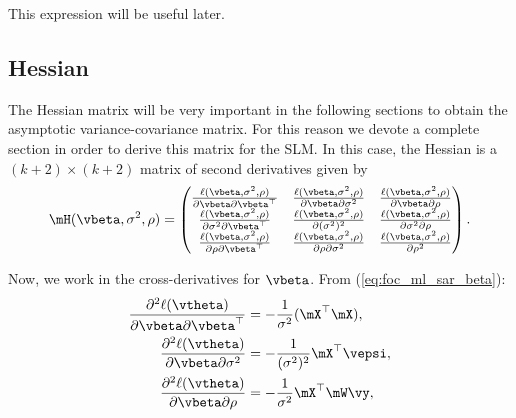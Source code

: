 This expression will be useful later. 

\subsection{Hessian}

The Hessian matrix will be very important in the following sections to obtain the asymptotic variance-covariance matrix. For this reason we devote a complete section in order to derive this matrix for the SLM. In this case, the Hessian is a $(k + 2)\times (k + 2)$ matrix of second derivatives given by
\begin{equation*}
	\mH(\vbeta, \sigma^2, \rho) = 
	\begin{pmatrix}
		\frac{\ell(\vbeta, \sigma^2,\rho)}{\partial \vbeta \partial \vbeta^\top} & \frac{\ell(\vbeta, \sigma^2,\rho)}{\partial \vbeta \partial \sigma^2} & \frac{\ell(\vbeta, \sigma^2,\rho)}{\partial \vbeta \partial \rho} \\
		\frac{\ell(\vbeta, \sigma^2,\rho)}{\partial \sigma^2 \partial \vbeta^\top} & \frac{\ell(\vbeta, \sigma^2,\rho)}{\partial (\sigma^2)^2} & \frac{\ell(\vbeta, \sigma^2,\rho)}{\partial \sigma^2 \partial \rho} \\
		\frac{\ell(\vbeta, \sigma^2,\rho)}{\partial \rho \partial \vbeta^\top} & \frac{\ell(\vbeta, \sigma^2,\rho)}{\partial \rho \partial \sigma^2} & \frac{\ell(\vbeta, \sigma^2,\rho)}{\partial \rho^2}
	\end{pmatrix}. 
\end{equation*}

Now, we work in the cross-derivatives for $\vbeta$. From (\ref{eq:foc_ml_sar_beta}):
\begin{align}
  \frac{\partial^2 \ell(\vtheta)}{\partial \vbeta \partial \vbeta^\top}  & =  - \frac{1}{\sigma^2}(\mX^\top \mX), \label{eq:sar_der_beta_beta} \\
  \frac{\partial^2  \ell(\vtheta)}{\partial \vbeta \partial \sigma^2} &= - \frac{1}{(\sigma^2)^2} \mX^\top \vepsi,\label{eq:sar_der_beta_sigma} \\
  \frac{\partial^2  \ell(\vtheta)}{\partial \vbeta \partial \rho}  & =  - \frac{1}{\sigma^2} \mX^\top \mW\vy\label{eq:sar_der_beta_rho},
\end{align}

